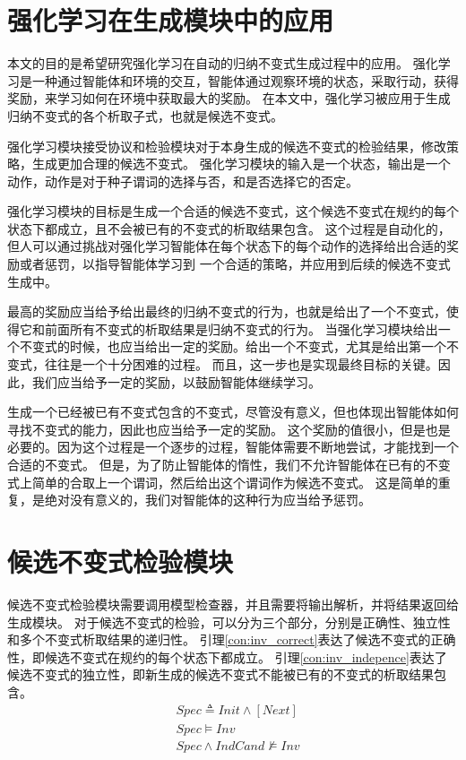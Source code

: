 \section{强化学习在生成模块中的应用}

本文的目的是希望研究强化学习在自动的归纳不变式生成过程中的应用。
强化学习是一种通过智能体和环境的交互，智能体通过观察环境的状态，采取行动，获得奖励，来学习如何在环境中获取最大的奖励。
在本文中，强化学习被应用于生成归纳不变式的各个析取子式，也就是候选不变式。

强化学习模块接受\TLA 协议和检验模块对于本身生成的候选不变式的检验结果，修改策略，生成更加合理的候选不变式。
强化学习模块的输入是一个状态，输出是一个动作，动作是对于种子谓词的选择与否，和是否选择它的否定。

强化学习模块的目标是生成一个合适的候选不变式，这个候选不变式在规约的每个状态下都成立，且不会被已有的不变式的析取结果包含。
这个过程是自动化的，但人可以通过挑战对强化学习智能体在每个状态下的每个动作的选择给出合适的奖励或者惩罚，以指导智能体学习到
一个合适的策略，并应用到后续的候选不变式生成中。

最高的奖励应当给予给出最终的归纳不变式的行为，也就是给出了一个不变式，使得它和前面所有不变式的析取结果是归纳不变式的行为。
当强化学习模块给出一个不变式的时候，也应当给出一定的奖励。给出一个不变式，尤其是给出第一个不变式，往往是一个十分困难的过程。
而且，这一步也是实现最终目标的关键。因此，我们应当给予一定的奖励，以鼓励智能体继续学习。

生成一个已经被已有不变式包含的不变式，尽管没有意义，但也体现出智能体如何寻找不变式的能力，因此也应当给予一定的奖励。
这个奖励的值很小，但是也是必要的。因为这个过程是一个逐步的过程，智能体需要不断地尝试，才能找到一个合适的不变式。
但是，为了防止智能体的惰性，我们不允许智能体在已有的不变式上简单的合取上一个谓词，然后给出这个谓词作为候选不变式。
这是简单的重复，是绝对没有意义的，我们对智能体的这种行为应当给予惩罚。


\section{候选不变式检验模块}

候选不变式检验模块需要调用模型检查器，并且需要将输出解析，并将结果返回给生成模块。
对于候选不变式的检验，可以分为三个部分，分别是正确性、独立性和多个不变式析取结果的递归性。
引理\ref{con:inv_correct}表达了候选不变式的正确性，即候选不变式在规约的每个状态下都成立。
引理\ref{con:inv_indepence}表达了候选不变式的独立性，即新生成的候选不变式不能被已有的不变式的析取结果包含。
\begin{align}
    &Spec \triangleq Init \wedge [Next] \\
    &Spec \vDash Inv \label{con:inv_correct} \\
    &Spec \wedge IndCand \nvDash Inv \label{con:inv_indepence}
\end{align}

